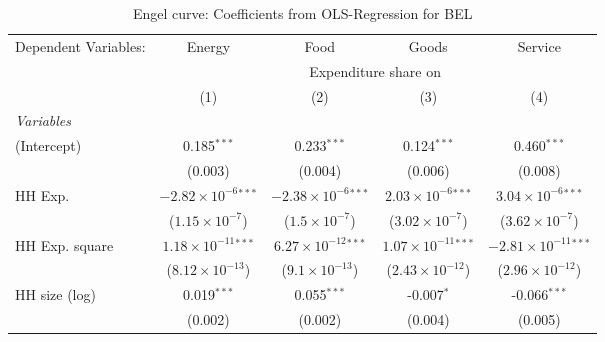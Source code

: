
\begin{table}[htbp!]
   \centering
   \small
   \begin{adjustbox}{width = 1\textwidth, max height = 0.95\textheight, center}
      \begin{threeparttable}[b]
         \caption{\label{tab:Engel_parametric_BEL} Engel curve: Coefficients from OLS-Regression for BEL}
         \begin{tabular}{lcccc}
            \tabularnewline \midrule \midrule
            Dependent Variables: & Energy                         & Food                           & Goods                          & Service\\  
             & \multicolumn{4}{c}{Expenditure share on} \\ 
                                 & (1)                            & (2)                            & (3)                            & (4)\\  
            \midrule
            \emph{Variables}\\
            (Intercept)          & 0.185$^{***}$                  & 0.233$^{***}$                  & 0.124$^{***}$                  & 0.460$^{***}$\\   
                                 & (0.003)                        & (0.004)                        & (0.006)                        & (0.008)\\   
            HH Exp.              & $-2.82\times 10^{-6}$$^{***}$  & $-2.38\times 10^{-6}$$^{***}$  & $2.03\times 10^{-6}$$^{***}$   & $3.04\times 10^{-6}$$^{***}$\\    
                                 & ($1.15\times 10^{-7}$)         & ($1.5\times 10^{-7}$)          & ($3.02\times 10^{-7}$)         & ($3.62\times 10^{-7}$)\\    
            HH Exp. square       & $1.18\times 10^{-11}$$^{***}$  & $6.27\times 10^{-12}$$^{***}$  & $1.07\times 10^{-11}$$^{***}$  & $-2.81\times 10^{-11}$$^{***}$\\    
                                 & ($8.12\times 10^{-13}$)        & ($9.1\times 10^{-13}$)         & ($2.43\times 10^{-12}$)        & ($2.96\times 10^{-12}$)\\    
            HH size (log)        & 0.019$^{***}$                  & 0.055$^{***}$                  & -0.007$^{*}$                   & -0.066$^{***}$\\   
                                 & (0.002)                        & (0.002)                        & (0.004)                        & (0.005)\\   

\end{tabular}
\end{threeparttable}
\end{adjustbox}
\end{table}
